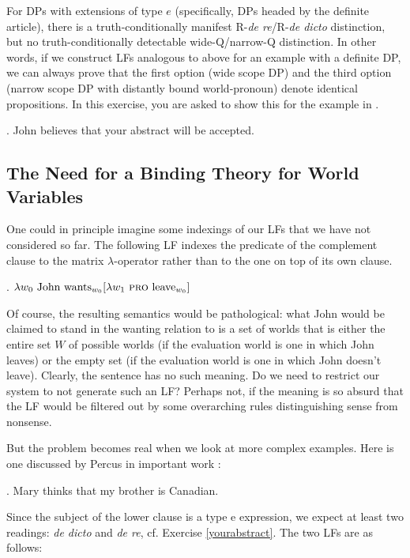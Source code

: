 \begin{exercise}\label{yourabstract}
	
	For DPs with extensions of type $e$ (specifically, DPs headed by the definite article), there is a truth-conditionally manifest R-\emph{de re}/R-\emph{de dicto} distinction, but no truth-conditionally detectable wide-Q/narrow-Q distinction. In other words, if we construct LFs analogous to \Last[a-c] above for an example with a definite DP, we can always prove that the first option (wide scope DP) and the third option (narrow scope DP with distantly bound world-pronoun) denote identical propositions. In this exercise, you are asked to show this for the example in \Next.
	
	\ex. John believes that your abstract will be accepted. \eex

\end{exercise}

\subsection{The Need for a Binding Theory for World Variables}

One could in principle imagine some indexings of our LFs that we have not considered so far. The following LF indexes the predicate of the complement clause to the matrix $\lambda$-operator rather than to the one on top of its own clause.

\ex. $\lambda w_{0} \mbox{ John wants}_{w_{0}} [ \lambda w_{1} \mbox{ \textsc{pro} } \mbox{leave}_{w_{0}} ]$

Of course, the resulting semantics would be pathological: what John would be claimed to stand in the wanting relation to is a set of worlds that is either the entire set $W$ of possible worlds (if the evaluation world is one in which John leaves) or the empty set (if the evaluation world is one in which John doesn't leave). Clearly, the sentence has no such meaning. Do we need to restrict our system to not generate such an LF? Perhaps not, if the meaning is so absurd that the LF would be filtered out by some overarching rules distinguishing sense from nonsense.

But the problem becomes real when we look at more complex examples. Here is one discussed by Percus in important work \citep{percus:other00}:

\ex. Mary thinks that my brother is Canadian.

Since the subject of the lower clause is a type e expression, we expect at least two readings: \emph{de dicto} and \emph{de re}, cf. Exercise \ref{yourabstract}. The two LFs are as follows:

